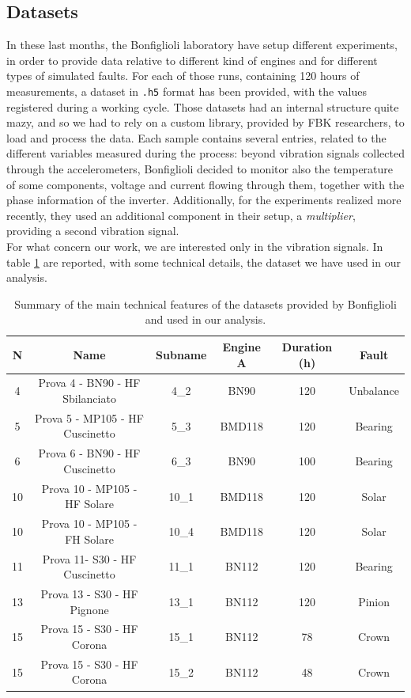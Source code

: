 \documentclass[../main.tex]{subfiles}
\begin{document}
\subsection{Datasets}

In these last months, the Bonfiglioli laboratory have setup different experiments, in order to provide data relative to different kind of engines and for different types of simulated faults. For each of those runs, containing 120 hours of measurements, a dataset in \texttt{.h5} format has been provided, with the values registered during a working cycle. Those datasets had an internal structure quite mazy, and so we had to rely on a custom library, provided by FBK researchers, to load and process the data. Each sample contains several entries, related to the different variables measured during the process: beyond vibration signals collected through the accelerometers, Bonfiglioli decided to monitor also the temperature of some components, voltage and current flowing through them, together with the phase information of the inverter. Additionally, for the experiments realized more recently, they used an additional component in their setup, a \textit{multiplier}, providing a second vibration signal.\\
For what concern our work, we are interested only in the vibration signals. In table \ref{tab:bonfiglioli_summary} are reported, with some technical details, the dataset we have used in our analysis.

\begin{table}[ht]
	\centering
	\begin{tabular}{c c c c c c}
		\toprule
		\textbf{N} & \textbf{Name} & \textbf{Subname} & \textbf{Engine A} & \textbf{Duration (h)} & \textbf{Fault}\\
		\midrule
		4  & Prova 4 - BN90 - HF Sbilanciato & 4\_2  & BN90   & 120 & Unbalance \\
		5  & Prova 5 - MP105 - HF Cuscinetto & 5\_3  & BMD118 & 120 & Bearing   \\
		6  & Prova 6 - BN90 - HF Cuscinetto  & 6\_3  & BN90   & 100 & Bearing   \\
		10 & Prova 10 - MP105 - HF Solare    & 10\_1 & BMD118 & 120 & Solar 	\\
		10 & Prova 10 - MP105 - FH Solare    & 10\_4 & BMD118 & 120 & Solar 	\\
		11 & Prova 11- S30 - HF Cuscinetto   & 11\_1 & BN112  & 120 & Bearing 	\\
		13 & Prova 13 - S30 - HF Pignone     & 13\_1 & BN112  & 120 & Pinion    \\
		15 & Prova 15 - S30 - HF Corona      & 15\_1 & BN112  & 78  & Crown		\\
		15 & Prova 15 - S30 - HF Corona      & 15\_2 & BN112  & 48  & Crown		\\
		\bottomrule
	\end{tabular}
	\caption{Summary of the main technical features of the datasets provided by Bonfiglioli and used in our analysis.}
	\label{tab:bonfiglioli_summary}
\end{table}
\end{document}
